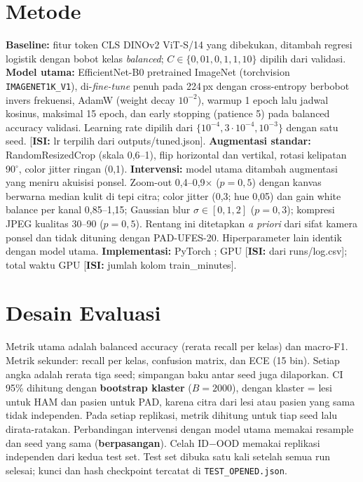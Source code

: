\documentclass[conference]{IEEEtran}
\newif\ifdraft \drafttrue
\newcommand{\TODO}[1]{\ifdraft{\color{red}[\textbf{ISI:} #1]}\else{\color{red}[TODO BELUM DIISI]}\fi}
\begin{document}
\section{Metode}
\textbf{Baseline:} fitur token CLS DINOv2 ViT-S/14 \cite{oquab2024dinov2} yang dibekukan, ditambah regresi logistik dengan bobot kelas \emph{balanced}; $C\in\{0{,}01,0{,}1,1,10\}$ dipilih dari validasi.
\textbf{Model utama:} EfficientNet-B0 \cite{tan2019efficientnet} pretrained ImageNet (torchvision \texttt{IMAGENET1K\_V1}), di-\emph{fine-tune} penuh pada 224\,px dengan cross-entropy berbobot invers frekuensi, AdamW \cite{loshchilov2019adamw} (weight decay $10^{-2}$), warmup 1 epoch lalu jadwal kosinus, maksimal 15 epoch, dan early stopping (patience 5) pada balanced accuracy validasi. Learning rate dipilih dari $\{10^{-4},3\cdot10^{-4},10^{-3}\}$ dengan satu seed. \TODO{lr terpilih dari outputs/tuned.json}.
\textbf{Augmentasi standar:} RandomResizedCrop (skala 0,6--1), flip horizontal dan vertikal, rotasi kelipatan 90$^\circ$, color jitter ringan (0,1).
\textbf{Intervensi:} model utama ditambah augmentasi yang meniru akuisisi ponsel. Zoom-out 0,4--0,9$\times$ ($p{=}0{,}5$) dengan kanvas berwarna median kulit di tepi citra; color jitter (0,3; hue 0,05) dan gain white balance per kanal 0,85--1,15; Gaussian blur $\sigma\in[0{,}1,2]$ ($p{=}0{,}3$); kompresi JPEG kualitas 30--90 ($p{=}0{,}5$). Rentang ini ditetapkan \emph{a priori} dari sifat kamera ponsel dan tidak dituning dengan PAD-UFES-20. Hiperparameter lain identik dengan model utama.
\textbf{Implementasi:} PyTorch \cite{paszke2019pytorch}; GPU \TODO{dari runs/log.csv}; total waktu GPU \TODO{jumlah kolom train\_minutes}.

\section{Desain Evaluasi}
Metrik utama adalah balanced accuracy (rerata recall per kelas) dan macro-F1. Metrik sekunder: recall per kelas, confusion matrix, dan ECE (15 bin). Setiap angka adalah rerata tiga seed; simpangan baku antar seed juga dilaporkan. CI 95\% dihitung dengan \textbf{bootstrap klaster} ($B{=}2000$), dengan klaster = lesi untuk HAM dan pasien untuk PAD, karena citra dari lesi atau pasien yang sama tidak independen. Pada setiap replikasi, metrik dihitung untuk tiap seed lalu dirata-ratakan. Perbandingan intervensi dengan model utama memakai resample dan seed yang sama (\textbf{berpasangan}). Celah ID$-$OOD memakai replikasi independen dari kedua test set. Test set dibuka satu kali setelah semua run selesai; kunci dan hash checkpoint tercatat di \texttt{TEST\_OPENED.json}.
\end{document}
